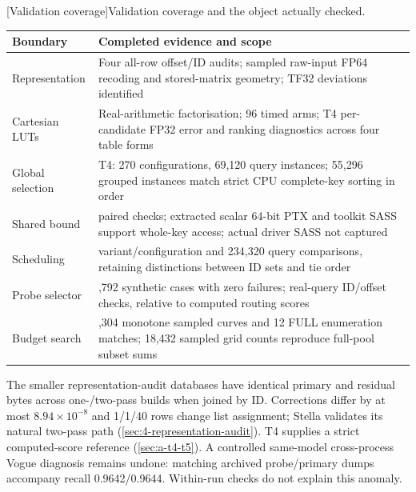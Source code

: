 \par\medskip\noindent\begin{minipage}{\linewidth}
\centering\captionsetup{hypcap=false}
[Validation coverage]{Validation coverage and the object actually checked.}
\label{tab:b-checks}
\footnotesize\setlength{\tabcolsep}{4pt}
\begin{tabularx}{\linewidth}{@{}>{\raggedright\arraybackslash}p{.22\linewidth}>{\raggedright\arraybackslash}X@{}}
\toprule
Boundary & Completed evidence and scope \\
\midrule
Representation & Four all-row offset/ID audits; sampled raw-input FP64
recoding and stored-matrix geometry; TF32 deviations identified \\
Cartesian LUTs & Real-arithmetic factorisation; 96 timed arms; T4
per-candidate FP32 error and ranking diagnostics across four table forms \\
Global selection & T4: 270 configurations, 69,120 query instances;
55,296 grouped instances match strict CPU complete-key sorting in order \\
Shared bound & 48 paired checks; extracted scalar 64-bit PTX and toolkit
SASS support whole-key access; actual driver SASS not captured \\
Scheduling & 250 variant/configuration and 234,320 query comparisons,
retaining distinctions between ID sets and tie order \\
Probe selector & 1,792 synthetic cases with zero failures; real-query
ID/offset checks, relative to computed routing scores \\
Budget search & 2,304 monotone sampled curves and 12 FULL enumeration
matches; 18,432 sampled grid counts reproduce full-pool subset sums \\
\bottomrule
\end{tabularx}
\end{minipage}\par\medskip

The smaller representation-audit databases have identical primary and
residual bytes across one-/two-pass builds when joined by ID.
Corrections differ by at most $8.94\times10^{-8}$ and 1/\allowbreak{}1/\allowbreak{}40 rows change
list assignment; Stella validates its natural two-pass path
(\cref{sec:4-representation-audit}). T4 supplies a strict computed-score reference (\cref{sec:a-t4-t5}). A controlled same-model cross-process Vogue diagnosis remains undone: matching archived probe/primary dumps accompany recall 0.9642/\allowbreak{}0.9644. Within-run checks do not explain this anomaly.


